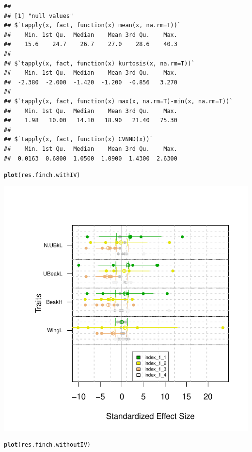 \documentclass[12pt]{article}\usepackage[]{graphicx}\usepackage[]{color}
\makeatletter
\def\maxwidth{ %
  \ifdim\Gin@nat@width>\linewidth
    \linewidth
  \else
    \Gin@nat@width
  \fi
}
\newcommand{\hlstd}[1]{\textcolor[rgb]{0.345,0.345,0.345}{#1}}%
\newcommand{\hlkwd}[1]{\textcolor[rgb]{0.737,0.353,0.396}{\textbf{#1}}}%
\newenvironment{kframe}{%
 \def\at@end@of@kframe{}%
 \ifinner\ifhmode%
  \def\at@end@of@kframe{\end{minipage}}%
  \begin{minipage}{\columnwidth}%
 \fi\fi%
 \def\FrameCommand##1{\hskip\@totalleftmargin \hskip-\fboxsep
 \colorbox{shadecolor}{##1}\hskip-\fboxsep
     \hskip-\linewidth \hskip-\@totalleftmargin \hskip\columnwidth}%
 \MakeFramed {\advance\hsize-\width
   \@totalleftmargin\z@ \linewidth\hsize
   \@setminipage}}%
 {\par\unskip\endMakeFramed%
 \at@end@of@kframe}
\newenvironment{knitrout}{}{} %
\makeatother
\begin{document}
\begin{knitrout}
\begin{kframe}
\begin{verbatim}
## 
## [1] "null values"
## $`tapply(x, fact, function(x) mean(x, na.rm=T))`
##    Min. 1st Qu.  Median    Mean 3rd Qu.    Max. 
##    15.6    24.7    26.7    27.0    28.6    40.3 
## 
## $`tapply(x, fact, function(x) kurtosis(x, na.rm=T))`
##    Min. 1st Qu.  Median    Mean 3rd Qu.    Max. 
##  -2.380  -2.000  -1.420  -1.200  -0.856   3.270 
## 
## $`tapply(x, fact, function(x) max(x, na.rm=T)-min(x, na.rm=T))`
##    Min. 1st Qu.  Median    Mean 3rd Qu.    Max. 
##    1.98   10.00   14.10   18.90   21.40   75.30 
## 
## $`tapply(x, fact, function(x) CVNND(x))`
##    Min. 1st Qu.  Median    Mean 3rd Qu.    Max. 
##  0.0163  0.6800  1.0500  1.0900  1.4300  2.6300
\end{verbatim}
\begin{alltt}
\hlkwd{plot}\hlstd{(res.finch.withIV)}
\end{alltt}
\end{kframe}
\includegraphics[width=\maxwidth]{figure/unnamed-chunk-391} 
\begin{kframe}\begin{alltt}
\hlkwd{plot}\hlstd{(res.finch.withoutIV)}
\end{alltt}
\end{kframe}

\end{knitrout}
\end{document}
